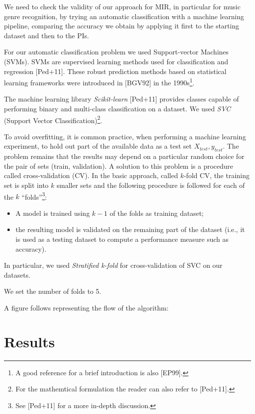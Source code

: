 \documentclass[english, LaM, oneside, noexaminfo]{sapthesis}
\begin{document}
We need to check the validity of our approach for MIR, in particular for music genre recognition, by trying an automatic classification with a machine learning pipeline, comparing the accuracy we obtain by applying it first to the starting dataset and then to the PIs.

For our automatic classification problem we used Support-vector Machines (SVMs). SVMs are supervised learning methods used for classification and regression [Ped+11]. These robust prediction methods based on statistical learning frameworks were introduced in [BGV92] in the 1990s\footnote{A good reference for a brief introduction is also [EP99].}.

The machine learning library \textit{Scikit-learn} [Ped+11] provides classes capable of performing binary and multi-class classification on a dataset. We used \textit{SVC} (Support Vector Classification)\footnote{For the mathemtical formulation the reader can also refer to [Ped+11].}.

To avoid overfitting, it is common practice, when performing a machine learning experiment, to hold out part of the available data as a test set $X_{test}, y_{test}$. The problem remains that the results may depend on a particular random choice for the pair of sets (train, validation). A solution to this problem is a procedure called cross-validation (CV). In the basic approach, called $k$-fold CV, the training set is split into $k$ smaller sets and the following procedure is followed for each of the $k$ “folds”\footnote{See [Ped+11] for a more in-depth discussion.}:
\begin{itemize}
    \item A model is trained using $k-1$ of the folds as training dataset;
    \item the resulting model is validated on the remaining part of the dataset (i.e., it is used as a testing dataset to compute a performance measure such as accuracy).
\end{itemize}

\noindent In particular, we used \textit{Stratified k-fold} for cross-validation of SVC on our datasets. 

\noindent We set the number of folds to 5.

A figure follows representing the flow of the algorithm:




\section{Results}
\end{document}
